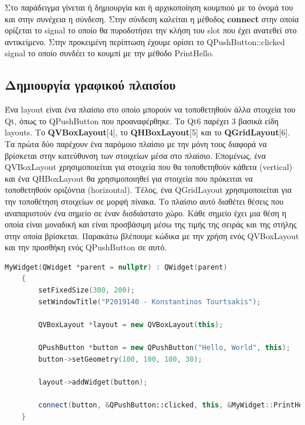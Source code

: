 Στο παράδειγμα γίνεται ή δημιουργία και ή αρχικοποίηση κουμπιού με το όνομά του και στην συνέχεια η σύνδεση.
Στην σύνδεση καλείται η μέθοδος \textbf{connect} στην οποία ορίζεται το signal το οποίο
θα πυροδοτήσει την κλήση του slot που έχει ανατεθεί στο αντικείμενο. Στην προκειμένη περίπτωση έχουμε
ορίσει το QPushButton::clicked signal το οποίο συνδέει το κουμπί με την μέθοδο PrintHello.

\subsection{Δημιουργία γραφικού πλαισίου}
Ένα layout είναι ένα πλαίσιο στο οποίο μπορούν να τοποθετηθούν άλλα στοιχεία του Qt, όπως
το QPushButton που προαναφέρθηκε. Το Qt6 παρέχει 3 βασικά είδη layouts. Το \textbf{QVBoxLayout}[4], το
\textbf{QHBoxLayout}[5] και το \textbf{QGridLayout}[6]. Τα πρώτα δύο παρέχουν ένα παρόμοιο πλαίσιο με την μόνη
τους διαφορά να βρίσκεται στην κατεύθυνση των στοιχείων μέσα στο πλαίσιο. Επομένως, ένα
QVBoxLayout χρησιμοποιείται για στοιχεία που θα τοποθετηθούν κάθετα (vertical) και ένα
QHBoxLayout θα χρησιμοποιηθεί για στοιχεία που πρόκειται να τοποθετηθούν οριζόντια (horizontal).
Τέλος, ένα QGridLayout χρησιμοποιείται για την τοποθέτηση στοιχείων σε μορφή πίνακα. Το
πλαίσιο αυτό διαθέτει θέσεις που αναπαριστούν ένα σημείο σε έναν δισδιάστατο χώρο. Κάθε σημείο
έχει μια θέση η οποία είναι μοναδική και είναι προσβάσιμη μέσω της τιμής της σειράς και της
στήλης στην οποία βρίσκεται. Παρακάτω βλέπουμε κώδικα με την χρήση ενός QVBoxLayout και την
προσθήκη ενός QPushButton σε αυτό.
\begin{lstlisting}[language=C++, style=cppstyle]
	MyWidget(QWidget *parent = nullptr) : QWidget(parent) 
    {
        setFixedSize(300, 200);
        setWindowTitle("P2019140 - Konstantinos Tourtsakis");
        
        QVBoxLayout *layout = new QVBoxLayout(this);

        QPushButton *button = new QPushButton("Hello, World", this);
        button->setGeometry(100, 100, 100, 30);

        layout->addWidget(button);

        connect(button, &QPushButton::clicked, this, &MyWidget::PrintHello);
    }

\end{lstlisting}



